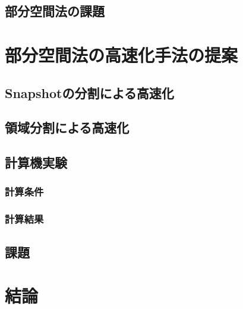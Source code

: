 \documentclass[a4j,12pt]{jreport}
\begin{document}
	\section{部分空間法の課題}
	
\chapter{部分空間法の高速化手法の提案} \label{chapter:3}
	\section{Snapshotの分割による高速化}
	\section{領域分割による高速化}
	\section{計算機実験}
		\subsection{計算条件}
		\subsection{計算結果}
	\section{課題}
\chapter{結論}


\end{document}
